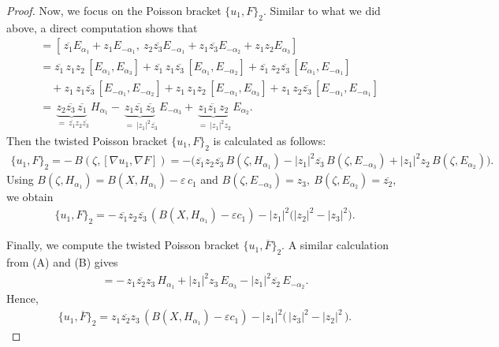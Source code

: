 \documentclass[10pt,a4paper]{amsart}
\begin{document}
\begin{proof}
 Now, we focus on the Poisson bracket $\{u_1,F\}_2$. Similar to what we did above, a direct computation shows that \begin{align*}
[\nabla u_1,\nabla F] &= \left[\,\overline{z_1}E_{\alpha_1}+z_1E_{-\alpha_1},\ z_2\overline{z_3}E_{-\alpha_1}+z_1\overline{z_3}E_{-\alpha_2}+z_1z_2E_{\alpha_3}\right]\\
&= \overline{z_1}\,z_1z_2\,[E_{\alpha_1},E_{\alpha_3}]+\overline{z_1}\,z_1\overline{z_3}\,[E_{\alpha_1},E_{-\alpha_2}] + \overline{z_1}\,z_2\overline{z_3}\,[E_{\alpha_1},E_{-\alpha_1}]\\
&\quad +  z_1\,z_1\overline{z_3}\,[E_{-\alpha_1},E_{-\alpha_2}] +  z_1\,z_1z_2\,[E_{-\alpha_1},E_{\alpha_3}] +  z_1\,z_2\overline{z_3}\,[E_{-\alpha_1},E_{-\alpha_1}]\\
&=  \underbrace{z_2\overline{z_3}\,\overline{z_1}}_{\;=\ \overline{z_1}z_2\overline{z_3}}\,H_{\alpha_1} - \underbrace{z_1\overline{z_1}\,\overline{z_3}}_{\;=\ |z_1|^2\overline{z_3}}\,E_{-\alpha_3} + \underbrace{z_1\overline{z_1}\,z_2}_{\;=\ |z_1|^2 z_2}\,E_{\alpha_2}.
\end{align*}
Then the twisted Poisson bracket $\{u_1,F\}_2$ is calculated as follows: \begin{align*}
\{u_1,F\}_2 =-\,B(\zeta,[\nabla u_1,\nabla F]) = -\Big(\overline{z_1}z_2\overline{z_3}\,B(\zeta,H_{\alpha_1}) - |z_1|^2\overline{z_3}\,B(\zeta,E_{-\alpha_3}) +  |z_1|^2 z_2\,B(\zeta,E_{\alpha_2})\Big).
\end{align*} Using $B(\zeta,H_{\alpha_1})=B(X,H_{\alpha_1})-\varepsilon\,c_1$ and $B(\zeta,E_{-\alpha_3})=z_3,\ B(\zeta,E_{\alpha_2})=\overline{z_2}$, we obtain \begin{align}
\{u_1,F\}_2 = -\,\overline{z_1}z_2\overline{z_3}\, \left(B(X,H_{\alpha_1})-\varepsilon c_1 \right) -|z_1|^2\big( |z_2|^2-|z_3|^2 \big). \label{eq:a1}
\end{align}

 Finally, we compute the twisted Poisson bracket $\{u_1,\overline{F}\}_2$. A similar calculation from (A) and (B) gives \begin{align*}
[\nabla u_1,\nabla \overline{F}] = -\,z_1\overline{z_2}z_3\,H_{\alpha_1}+|z_1|^2 z_3\,E_{\alpha_3}-|z_1|^2\overline{z_2}\,E_{-\alpha_2}.
\end{align*} Hence, \begin{align}
\{u_1,\overline{F}\}_2 = z_1\overline{z_2}z_3\,\left(B(X,H_{\alpha_1})-\varepsilon c_1\right) -|z_1|^2\big(\,|z_3|^2-|z_2|^2\,\big). \label{eq:a2}
\end{align}


\end{proof}
\end{document}
